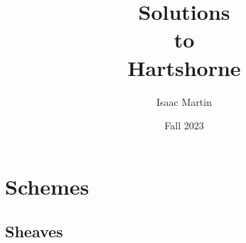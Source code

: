 

\title[Solutions to Algebraic Geometry by Robin Hartshorne]{\setlength{\parindent}{0pt}Solutions \\to \\Hartshorne} %
\author{Isaac Martin} %
\date{Fall 2023}



\maketitle
\tableofcontents %





\setcounter{chapter}{1}
\chapter{Schemes}
\section{Sheaves}

